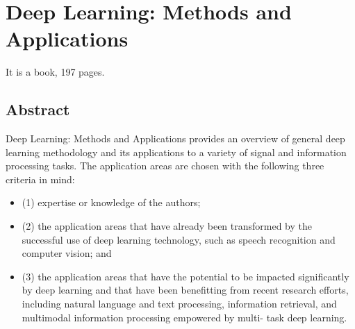 \documentclass[]{article}
\begin{document}
	\section{Deep Learning: Methods and Applications \cite{Deng2013}}
		It is a book, 197 pages.
		\subsection{Abstract}
			Deep Learning: Methods and Applications provides an overview of general deep learning methodology and its applications to a variety of signal and information processing tasks. The application areas are chosen with the following three criteria in mind: 
		\begin{itemize}
			\item(1) expertise or knowledge of the authors; 
			\item(2) the application areas that have already been transformed by the successful use of deep learning technology, such as speech recognition and computer vision; and 
			\item(3) the application areas that have the potential to be impacted significantly by deep learning and that have been benefitting from recent research efforts, including natural language and text processing, information retrieval, and multimodal information processing empowered by multi- task deep learning.
		\end{itemize}
		
	
	
		
		
	
\end{document}
